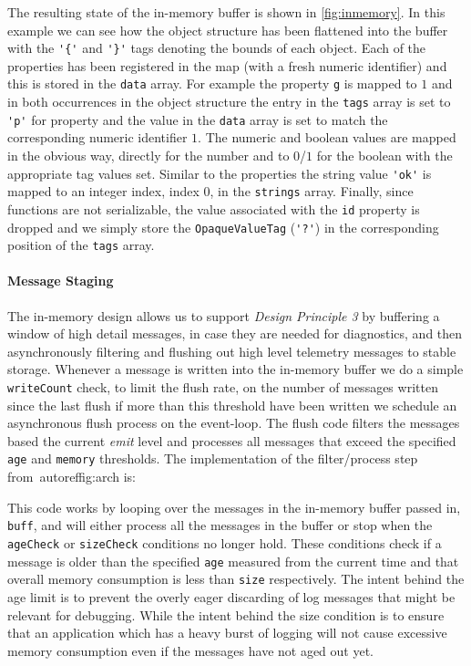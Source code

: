 The resulting state of the in-memory buffer is shown in \autoref{fig:inmemory}. 
In this example we can see how the object structure has been flattened into 
the buffer with the \lstinline!'{'! and \lstinline!'}'! tags denoting the bounds 
of each object. Each of the properties has been registered in the map (with a fresh 
numeric identifier) and this is stored in the \texttt{data} array. For example the 
property \lstinline!g! is mapped to $1$ and in both occurrences in the object 
structure the entry in the \texttt{tags} array is set to \lstinline!'p'! for 
property and the value in the \texttt{data} array is set to match the corresponding 
numeric identifier $1$. The numeric and boolean values are mapped in the obvious 
way, directly for the number and to $0$/$1$ for the boolean with the appropriate 
tag values set. Similar to the properties the string value \lstinline!'ok'! is 
mapped to an integer index, index $0$, in the \texttt{strings} array. Finally, 
since functions are not serializable, the value associated with the \lstinline!id! 
property is dropped and we simply store the \texttt{OpaqueValueTag} (\lstinline!'?'!) 
in the corresponding position of the \texttt{tags} array.

\paragraph{Message Staging}
\noindent
The in-memory design allows us to support \emph{Design Principle 3} by buffering a 
window of high detail messages, in case they are needed for diagnostics, and then 
asynchronously filtering and flushing out high level telemetry messages to stable 
storage. Whenever a message is written into the in-memory buffer we do a simple 
\texttt{writeCount} check, to limit the flush rate, on the number of messages written 
since the last flush if more than this threshold have been written we schedule an 
asynchronous flush process on the event-loop. The flush code filters the messages 
based the current \emph{emit} level and processes all messages that exceed the 
specified \texttt{age} and \texttt{memory} thresholds. The implementation of the 
filter/process step from~autoref{fig:arch} is:



This code works by looping over the messages in the in-memory buffer passed in, 
\lstinline!buff!, and will either process all the messages in the buffer or 
stop when the \lstinline!ageCheck! or \lstinline!sizeCheck! conditions no longer 
hold. These conditions check if a message is older than the specified 
\lstinline!age! measured from the current time and that overall memory 
consumption is less than \lstinline!size! respectively. The intent behind the 
age limit is to prevent the overly eager discarding of log messages that might 
be relevant for debugging. While the intent behind the size condition is to ensure 
that an application which has a heavy burst of logging will not cause excessive 
memory consumption even if the messages have not aged out yet.

